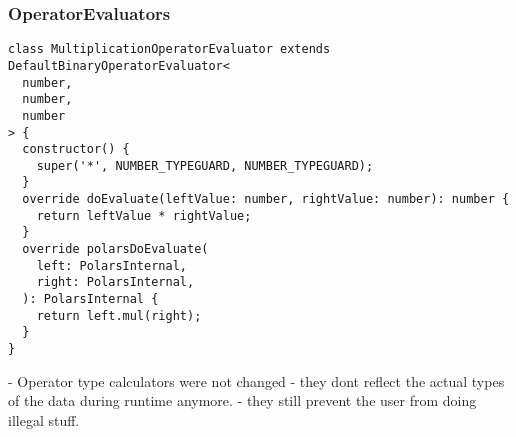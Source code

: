 \subsubsection{OperatorEvaluators}
\begin{listing}
	\begin{verbatim}
class MultiplicationOperatorEvaluator extends DefaultBinaryOperatorEvaluator<
  number,
  number,
  number
> {
  constructor() {
    super('*', NUMBER_TYPEGUARD, NUMBER_TYPEGUARD);
  }
  override doEvaluate(leftValue: number, rightValue: number): number {
    return leftValue * rightValue;
  }
  override polarsDoEvaluate(
    left: PolarsInternal,
    right: PolarsInternal,
  ): PolarsInternal {
    return left.mul(right);
  }
}
	\end{verbatim}

\end{listing}





- Operator type calculators were not changed
- they dont reflect the actual types of the data during runtime anymore.
- they still prevent the user from doing illegal stuff.


